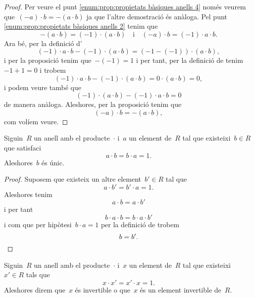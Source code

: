 \documentclass[../../main.tex]{subfiles}
\begin{document}
\begin{proposition}
\begin{proof}
            Per veure el punt \eqref{enum:prop:propietats bàsiques anells 4} només veurem que~\((-a)\cdot b=-(a\cdot b)\) ja que l'altre demostració és anàloga.
            Pel punt \eqref{enum:prop:propietats bàsiques anells 2} tenim que
            \[
                -(a\cdot b)=(-1)\cdot(a\cdot b)\quad{\text{i}}\quad(-a)\cdot b=(-1)\cdot a\cdot b.
            \]
            Ara bé, per la definició d'
            \[
                (-1)\cdot a\cdot b-(-1)\cdot(a\cdot b)=(-1-(-1))\cdot(a\cdot b),
            \]
            i per la proposició  tenim que~\(-(-1)=1\) i per tant, per la definició de  tenim~\(-1+1=0\) i trobem
            \[
                (-1)\cdot a\cdot b-(-1)\cdot(a\cdot b)=0\cdot(a\cdot b)=0,
            \]
            i podem veure també que
            \[
                (-1)\cdot(a\cdot b)-(-1)\cdot a\cdot b=0
            \]
            de manera anàloga.
            Aleshores, per la proposició  tenim que
            \[
                (-a)\cdot b=-(a\cdot b),
            \]
            com volíem veure.
        \end{proof}
    \end{proposition}
    \begin{proposition}
        \label{prop:unicitat invers en anells}
        Siguin~\(R\) un anell amb el producte~\(\cdot\) i~\(a\) un element de~\(R\) tal que existeixi~\(b\in R\) que satisfaci
        \[
            a\cdot b=b\cdot a=1.
        \]
        Aleshores~\(b\) és únic.
        \begin{proof}
            Suposem que existeix un altre element~\(b'\in R\) tal que
            \[
                a\cdot b'=b'\cdot a=1.
            \]
            Aleshores tenim
            \[
                a\cdot b=a\cdot b'
            \]
            i per tant
            \[
                b\cdot a\cdot b=b\cdot a\cdot b'
            \]
            i com que per hipòtesi~\(b\cdot a=1\) per la definició de  trobem
            \[
                b=b'.\qedhere
            \]
        \end{proof}
    \end{proposition}
    \begin{definition}
        \label{def:element invertible pel producte d'un anell}
        Siguin~\(R\) un anell amb el producte~\(\cdot\) i~\(x\) un element de~\(R\) tal que existeixi~\(x'\in R\) tals que
        \[
            x\cdot x'=x'\cdot x=1.
        \]
        Aleshores direm que~\(x\) és invertible o que~\(x\) és un element invertible de~\(R\).
    \end{definition}
\end{document}
